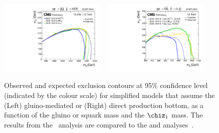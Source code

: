 \begin{figure}[thp!]
  \begin{center}
    \includegraphics[width=0.45\textwidth]{./Figures/statisticalResults/T1bbbb_limits_summary_cms_ICHEP16} ~
    \includegraphics[width=0.45\textwidth]{./Figures/statisticalResults/T2bb_limits_summary_cms_ICHEP16}
    \caption{Observed and expected exclusion contours at 95\% confidence
      level (indicated by the colour scale) for simplified models that
      assume the (Left) gluino-mediated or (Right) direct production
      bottom, as a function of the gluino or squark mass and the $\chiz_{1}$ 
      mass. The results from the \alphat~analysis are compared to 
      the \mtt and \htmiss analyses~\cite{mt2,ra2}. \label{fig:limits-sms-competition} }
  \end{center}
\end{figure}
